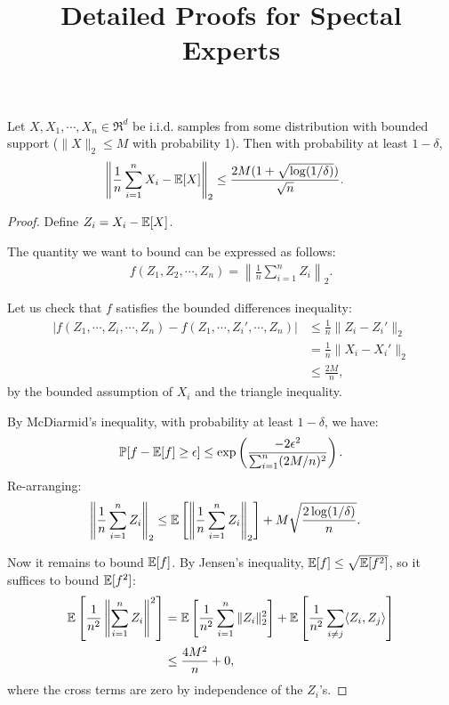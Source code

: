 \documentclass[tablecaption=bottom]{jmlr}
\title{Detailed Proofs for Spectal Experts}
\author{\Name{Arun Tejasvi Chaganty} \Email{chaganty@stanford.edu}}
\begin{document}
\maketitle

\begin{lemma}
  \label{lemma:conc-norms}
  Let $X, X_1, \cdots, X_n \in \Re^d$ be i.i.d. samples
  from some distribution with bounded support
  ($\|X\|_2 \le M$ with probability 1).
  Then with probability at least $1 - \delta$,
  \begin{align}
    \left\| \frac{1}{n} \sum_{i=1}^{n} X_i - \operatorname{\mathbb{E}}[X] \right\|_2 &
    \le \frac{2 M (1 + \sqrt{\log(1/\delta)})}{\sqrt{n}}.
  \end{align}
\end{lemma}
\begin{proof}
  Define $Z_i = X_i - \operatorname{\mathbb{E}}[X]$.


The quantity we want to bound can be expressed as follows:
  \begin{align}
  f(Z_1, Z_2, \cdots, Z_n) = \left\| \frac1n \sum_{i=1}^n Z_i \right\|_2.
  \end{align}

Let us check that $f$ satisfies the bounded differences inequality:
  \begin{align}
|f(Z_1, \cdots, Z_i, \cdots, Z_n) - f(Z_1, \cdots, Z_i', \cdots, Z_n)|
& \le \frac1n \|Z_i - Z_i'\|_2 \\
& = \frac1n \|X_i - X_i'\|_2 \\
&\le \frac{2M}{n},
  \end{align}
  by the bounded assumption of $X_i$ and the triangle inequality.

By McDiarmid's inequality,
with probability at least $1 - \delta$,
we have:
\begin{align}
\mathbb{P}[f - \operatorname{\mathbb{E}}[f] \ge \epsilon] \le
\exp\left(\frac{-2 \epsilon^2}{\sum_{i=1}^n (2M/n)^2}\right).
\end{align}
Re-arranging:
\begin{align}
  \left\|\frac{1}{n}\sum_{i=1}^n Z_i\right\|_2
  &\le \operatorname{\mathbb{E}}\left[ \left\| \frac{1}{n} \sum_{i=1}^n Z_i \right\|_2 \right]
  + M\sqrt{\frac{2\log(1/\delta)}{n}}.
\end{align}

Now it remains to bound $\operatorname{\mathbb{E}}[f]$.
By Jensen's inequality, $\operatorname{\mathbb{E}}[f] \le \sqrt{\operatorname{\mathbb{E}}[f^2]}$,
so it suffices to bound $\operatorname{\mathbb{E}}[f^2]$:
\begin{align}
  \operatorname{\mathbb{E}}\left[ \frac1{n^2} \left\| \sum_{i=1}^n Z_i \right\|^2 \right]
  &= \operatorname{\mathbb{E}}\left[ \frac1{n^2} \sum_{i=1}^n \|Z_i\|_2^2 \right] +
\operatorname{\mathbb{E}}\left[ \frac1{n^2} \sum_{i\neq j} \langle Z_i, Z_j \rangle \right] \\ 
& \le \frac{4M^2}{n} + 0,
\end{align}
where the cross terms are zero by independence of the $Z_i$'s.


\end{proof}
\end{document}
